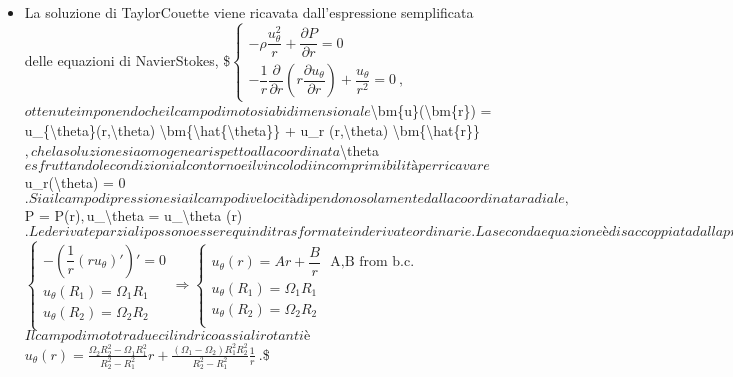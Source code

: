\documentclass[letterpaper,10pt,italian]{jupyterBook}
\begin{document}
\begin{itemize}
\item {} 
\sphinxAtStartPar
La soluzione di Taylor\sphinxhyphen{}Couette viene ricavata dall’espressione
semplificata delle equazioni di Navier\sphinxhyphen{}Stokes, \$\(\begin{cases}
  -\rho \dfrac{u^2_\theta}{r} + \dfrac{\partial P}{\partial r} = 0 \\
  -\dfrac{1}{r}\dfrac{\partial}{\partial r} \left( r \dfrac{\partial u_\theta}{\partial r}  \right)  + \dfrac{u_\theta}{r^2}= 0 \ ,
\end{cases}\)\( ottenute imponendo che il campo di moto sia
bidimensionale
\)\textbackslash{}bm\{u\}(\textbackslash{}bm\{r\}) = u\_\{\textbackslash{}theta\}(r,\textbackslash{}theta) \textbackslash{}bm\{\textbackslash{}hat\{\textbackslash{}theta\}\} + u\_r (r,\textbackslash{}theta) \textbackslash{}bm\{\textbackslash{}hat\{r\}\}\(,
che la soluzione sia omogenea rispetto alla coordinata \)\textbackslash{}theta\( e
sfruttando le condizioni al contorno e il vincolo di
incomprimibilità per ricavare \)u\_r(\textbackslash{}theta) = 0\(. Sia il campo di
pressione sia il campo di velocità dipendono solamente dalla
coordinata radiale, \)P = P(r)\(, \)u\_\textbackslash{}theta = u\_\textbackslash{}theta (r)\(. Le
derivate parziali possono essere quindi trasformate in derivate
ordinarie. La seconda equazione è disaccoppiata dalla prima e può
essere risolta, una volta imposte le condizioni al contorno. Trovato
il campo di moto da questa equazione, la prima viene usata per
calcolare il campo di pressione. La seconda equazione può essere
riscritta come (svolgere le derivate per credere!) \)\(\begin{cases}
  -\left(\dfrac{1}{r} \left(r u_\theta\right)'\right)' = 0 \\
  u_\theta(R_1) = \Omega_1 R_1 \\
  u_\theta(R_2) = \Omega_2 R_2 \\
\end{cases}
\Rightarrow
\begin{cases}
  u_\theta(r) = A r + \dfrac{B}{r} \ \ \ \text{A,B from b.c.} \\
  u_\theta(R_1) = \Omega_1 R_1 \\
  u_\theta(R_2) = \Omega_2 R_2 \\
\end{cases}\)\( Il campo di moto tra due cilindri coassiali rotanti è
\)\(u_\theta(r) = \frac{\Omega_2 R_2^2 - \Omega_1 R_1^2}{R_2^2-R_1^2} r +
   \frac{(\Omega_1 - \Omega_2)R_1^2 R_2^2}{R_2^2-R_1^2}\frac{1}{r} \ .\)\$


\end{itemize}
\end{document}

